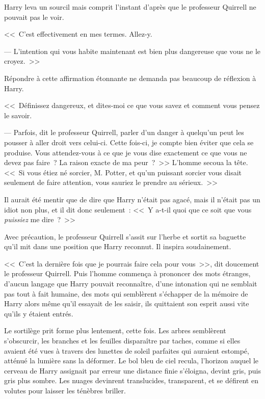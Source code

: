 Harry leva un sourcil mais comprit l'instant d'après que le professeur Quirrell ne pouvait pas le voir.

<<~C'est effectivement en mes termes. Allez-y.

--- L'intention qui vous habite maintenant est bien plus dangereuse que vous ne le croyez.~>>

Répondre à cette affirmation étonnante ne demanda pas beaucoup de réflexion à Harry.

<<~Définissez dangereux, et dites-moi ce que vous savez et comment vous pensez le savoir.

--- Parfois, dit le professeur Quirrell, parler d'un danger à quelqu'un peut les pousser à aller droit vers celui-ci. Cette fois-ci, je compte bien éviter que cela se produise. Vous attendez-vous à ce que je vous dise exactement ce que vous ne devez pas faire~? La raison exacte de ma peur~?~>> L'homme secoua la tête. <<~Si vous étiez né sorcier, M. Potter, et qu'un puissant sorcier vous disait seulement de faire attention, vous sauriez le prendre au sérieux.~>>

Il aurait été mentir que de dire que Harry n'était pas agacé, mais il n'était pas un idiot non plus, et il dit donc seulement~: <<~Y a-t-il quoi que ce soit que vous \emph{puissiez} me dire~?~>>

Avec précaution, le professeur Quirrell s'assit sur l'herbe et sortit sa baguette qu'il mit dans une position que Harry reconnut. Il inspira soudainement.

<<~C'est la dernière fois que je pourrais faire cela pour vous~>>, dit doucement le professeur Quirrell. Puis l'homme commença à prononcer des mots étranges, d'aucun langage que Harry pouvait reconnaître, d'une intonation qui ne semblait pas tout à fait humaine, des mots qui semblèrent s'échapper de la mémoire de Harry alors même qu'il essayait de les saisir, ils quittaient son esprit aussi vite qu'ils y étaient entrés.

Le sortilège prit forme plus lentement, cette fois. Les arbres semblèrent s'obscurcir, les branches et les feuilles disparaître par taches, comme si elles avaient été vues à travers des lunettes de soleil parfaites qui auraient estompé, atténué la lumière sans la déformer. Le bol bleu de ciel recula, l'horizon auquel le cerveau de Harry assignait par erreur une distance finie s'éloigna, devint gris, puis gris plus sombre. Les nuages devinrent translucides, transparent, et se défirent en volutes pour laisser les ténèbres briller.

